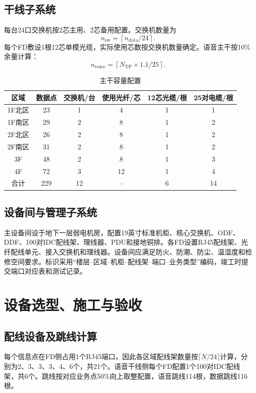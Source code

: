\documentclass[UTF8,a4paper,12pt]{ctexart}
\begin{document}
\subsection{干线子系统}
每台24口交换机按2芯主用、2芯备用配置。交换机数量为
\[
n_{\mathrm{sw}}=\left\lceil n_{\mathrm{data}}/24\right\rceil .
\]
每个FD敷设1根12芯单模光缆，实际使用芯数按交换机数量确定。语音主干按10\%余量计算：
\[
n_{\mathrm{voice}}=\left\lceil N_{\mathrm{TP}}\times1.1/25\right\rceil .
\]

\begin{table}[H]
\centering
\caption{主干容量配置}
\small
\begin{tabular}{|c|c|c|c|c|c|}
\hline
区域 & 数据点 & 交换机/台 & 使用光纤/芯 & 12芯光缆/根 & 25对电缆/根\\ \hline
1F北区 & 23 & 1 & 4 & 1 & 1\\
1F南区 & 29 & 2 & 8 & 1 & 2\\
2F北区 & 26 & 2 & 8 & 1 & 2\\
2F南区 & 31 & 2 & 8 & 1 & 2\\
3F & 48 & 2 & 8 & 1 & 3\\
4F & 72 & 3 & 12 & 1 & 4\\ \hline
合计 & 229 & 12 & -- & 6 & 14\\ \hline
\end{tabular}
\end{table}

\subsection{设备间与管理子系统}
主设备间设于地下一层弱电机房，配置19英寸标准机柜、核心交换机、ODF、DDF、100对IDC配线架、理线器、PDU和接地铜排。各FD设置RJ45配线架、光纤配线单元、接入交换机和理线器。设备间应满足防火、防潮、防尘、温湿度和检修空间要求。标识采用“楼层--区域--机柜--配线架--端口--业务类型”编码，竣工时提交端口对应表和测试记录。

\section{设备选型、施工与验收}

\subsection{配线设备及跳线计算}
每个信息点在FD侧占用1个RJ45端口，因此各区域配线架数量按$\lceil N/24\rceil$计算，分别为2、3、3、3、4、6个，共21个。语音干线侧每个FD配置1个100对IDC配线架，共6个。跳线按对应业务点50\%向上取整配置，语音跳线114根，数据跳线116根。
\end{document}
